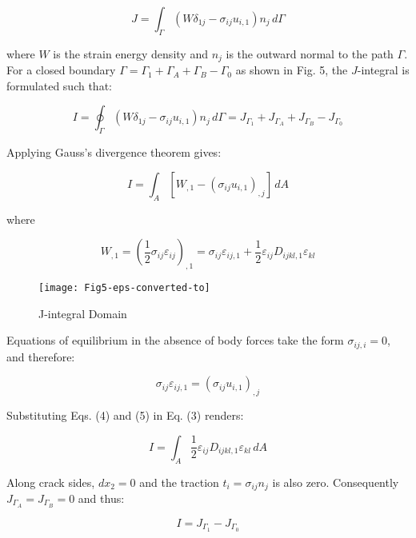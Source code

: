 \begin{equation}
J = \int_\Gamma (W \delta_{1j} - \sigma_{ij}u_{i,1})n_j \,d\Gamma
\end{equation}

where $W$ is the strain energy density and $n_j$ is the outward normal to the path $\Gamma$. For a closed boundary $\Gamma = \Gamma_1 + \Gamma_A + \Gamma_B - \Gamma_0$ as shown in Fig. 5, the $J$-integral is formulated such that:

\begin{equation}
I = \oint_{\Gamma} (W \delta_{1j} - \sigma_{ij}u_{i,1})n_j \,d\Gamma = J_{\Gamma_1} + J_{\Gamma_A} + J_{\Gamma_B} - J_{\Gamma_0}
\end{equation}

Applying Gauss's divergence theorem gives:

\begin{equation}
I = \int_A [W_{,1} - (\sigma_{ij}u_{i,1})_{,j}] \,dA 
\end{equation}

where

\begin{equation}
W_{,1}=(\frac{1}{2} \sigma_{ij} \varepsilon_{ij})_{,1} = \sigma_{ij} \varepsilon_{ij,1} + \frac{1}{2} \varepsilon_{ij} D_{ijkl,1} \varepsilon_{kl}
\end{equation}

\begin{figure}
\centering
\texttt{[image: Fig5-eps-converted-to]}
\caption{J-integral Domain}
\label{fig:Fig5}
\end{figure}

Equations of equilibrium in the absence of body forces take the form $\sigma_{ij,i}=0$, and therefore:

\begin{equation}
\sigma_{ij} \varepsilon_{ij,1} = (\sigma_{ij} u_{i,1})_{,j}
\end{equation}

Substituting Eqs. (4) and (5) in Eq. (3) renders:

\begin{equation}
I = \int_A \frac{1}{2} \varepsilon_{ij} D_{ijkl,1} \varepsilon_{kl} \,dA 
\end{equation}

Along crack sides, $dx_2 = 0$ and the traction $t_i = \sigma_{ij} n_j$ is also zero. Consequently $J_{\Gamma_A}=J_{\Gamma_B}=0$ and thus:

\begin{equation}
I = J_{\Gamma_1} - J_{\Gamma_0}
\end{equation}


